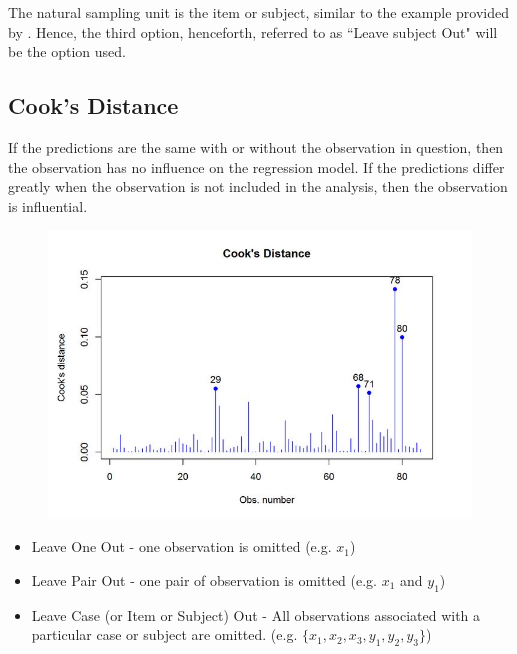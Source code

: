 \documentclass[12pt, a4paper]{report}
\theoremstyle{plain}
\theoremstyle{definition}
\theoremstyle{remark}
\begin{document}
The natural sampling unit is the item or subject, similar to the example provided by \citet{schabenberger}. Hence, the third option, henceforth, referred to as ``Leave subject Out" will be the option used.


\newpage

\subsection{Cook's Distance}



If the predictions are the same with or without the observation in question, then the observation has no influence on the regression model. If the predictions differ greatly when the observation is not included in the analysis, then the observation is influential.
	



	

	
	
	
	
	\begin{figure}[h!]
		\centering
		\includegraphics[width=0.9\linewidth]{images/CooksDistancePlot-JS-Roy}
		\caption{}
		\label{fig:CooksDistancePlot-JS-Roy}
	\end{figure}	
	

	
	\begin{itemize}
		\item Leave One Out - one observation is omitted (e.g. $x_1$)
		\item Leave Pair Out - one pair of observation  is omitted (e.g. $x_1$ and $y_1$)
		\item Leave Case (or Item or Subject) Out - All observations associated with a particular case or subject are omitted. (e.g. $\{x_1,x_2,x_3,y_1,y_2,y_3\}$)
	\end{itemize}
\end{document}
